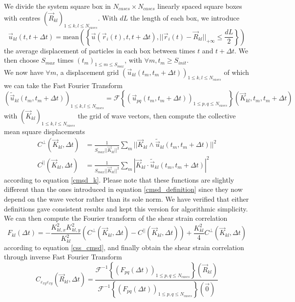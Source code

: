 \documentclass[class=report, float=false, crop=false]{standalone}
\begin{document}
We divide the system square box in $N_{cases} \times N_{cases}$ linearly spaced square boxes with centres $(\vec{R}_{kl})_{1 \leq k, l \leq N_{cases}}$. With $dL$ the length of each box, we introduce
\begin{equation}
\vec{u}_{kl}(t, t + \Delta t) = \text{mean}\left(\left\{\vec{u}(\vec{r}_i(t), t, t + \Delta t), ||\vec{r}_i(t) - \vec{R}_{kl}||_{+\infty} \leq \frac{dL}{2}\right\}\right)
\end{equation}
the average displacement of particles in each box between times $t$ and $t + \Delta t$. We then choose $S_{max}$ times $(t_m)_{1 \leq m \leq S_{max}}$, with $\forall m, t_m \geq S_{init}$.\\

We now have $\forall m$, a displacement grid $(\vec{u}_{kl}(t_m, t_m + \Delta t))_{1 \leq k, l \leq N_{cases}}$ of which we can take the Fast Fourier Transform
\begin{equation}
(\tilde{\vec{u}}_{kl}(t_m, t_m + \Delta t))_{1 \leq k, l \leq N_{cases}} = \mathcal{F}\left\{(\vec{u}_{pq}(t_m, t_m + \Delta t))_{1 \leq p, q \leq N_{cases}}\right\}(\vec{K}_{kl}, t_m, t_m + \Delta t)
\end{equation}
with $(\vec{K}_{kl})_{1 \leq k, l \leq N_{cases}}$ the grid of wave vectors, then compute the collective mean square displacements
\begin{equation}
\begin{aligned}
C^{\perp}(\vec{K}_{kl}, \Delta t) &= \frac{1}{S_{max}||\vec{K}_{kl}||^2}\sum_m ||\vec{K}_{kl}\wedge\tilde{\vec{u}}_{kl}(t_m, t_m + \Delta t) ||^2\\
C^{||}(\vec{K}_{kl}, \Delta t) &= \frac{1}{S_{max}||\vec{K}_{kl}||^2}\sum_m |\vec{K}_{kl}\cdot\tilde{\vec{u}}_{kl}(t_m, t_m + \Delta t)|^2
\end{aligned}
\end{equation}
according to equation \ref{cmsd_k}. Please note that these functions are slightly different than the ones introduced in equation \ref{cmsd_definition} since they now depend on the wave vector rather than its sole norm. We have verified that either definitions gave consistent results and kept this version for algorithmic simplicity.\\

We can then compute the Fourier transform of the shear strain correlation
\begin{equation}
F_{kl}(\Delta t) = -\frac{K_{kl,x}^2K_{kl,y}^2}{K_{kl}^2}\left(C^{\perp}(\vec{K}_{kl}, \Delta t) - C^{||}(\vec{K}_{kl}, \Delta t)\right) + \frac{K_{kl}^2}{4}C^{\perp}(\vec{K}_{kl}, \Delta t)
\label{css_ft}
\end{equation}
according to equation \ref{css_cmsd}, and finally obtain the shear strain correlation through inverse Fast Fourier Transform
\begin{equation}
C_{\varepsilon_{xy}\varepsilon_{xy}}(\vec{R}_{kl}, \Delta t) = \frac{\mathcal{F}^{-1}\left\{\left(F_{pq}(\Delta t)\right)_{1 \leq p, q \leq N_{cases}}\right\}(\vec{R}_{kl})}{\mathcal{F}^{-1}\left\{\left(F_{pq}(\Delta t)\right)_{1 \leq p, q \leq N_{cases}}\right\}(\vec{0})}
\end{equation}
\mbox{}
\end{document}

